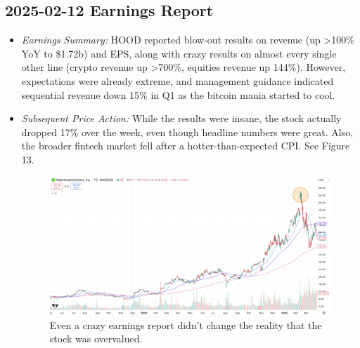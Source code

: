 \documentclass[11pt]{article}
\begin{document}
    \subsection{2025-02-12 Earnings Report}
        \begin{itemize}
            \item \textit{Earnings Summary:} HOOD reported blow-out results on revenue (up >100\% YoY to \$1.72b) and EPS, along with crazy results on almost every single other line (crypto revenue up >700\%, equities revenue up 144\%). However, expectations were already extreme, and management guidance indicated sequential revenue down 15\% in Q1 as the bitcoin mania started to cool.
            \item \textit{Subsequent Price Action:} While the results were insane, the stock actually dropped 17\% over the week, even though headline numbers were great. Also, the broader fintech market fell after a hotter-than-expected CPI. See Figure 13.
            \begin{figure}[h]
                \centering \includegraphics[width=0.8\linewidth]{images/HOOD1.png}
                \caption{Even a crazy earnings report didn't change the reality that the stock was overvalued.}
            \end{figure}
        \end{itemize}
\end{document}
